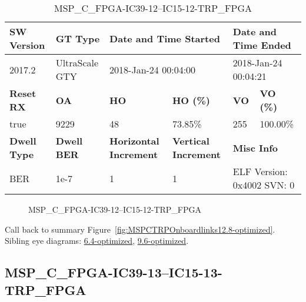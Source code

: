 \begin{table}[h]
\centering
\caption{MSP\_C\_FPGA-IC39-12--IC15-12-TRP\_FPGA}
\label{tab:MSPCFPGAIC3912IC1512TRPFPGA12.8-optimized}
\begin{tabular}{@{}|l|l|l|l|l|l|@{}}
\toprule
\textbf{SW Version}                & \textbf{GT Type}   & \multicolumn{2}{l|}{\textbf{Date and Time Started}}            & \multicolumn{2}{l|}{\textbf{Date and Time Ended}}        \\ \midrule
2017.2                       & UltraScale GTY          & \multicolumn{2}{l|}{2018-Jan-24 00:04:00}                   & \multicolumn{2}{l|}{2018-Jan-24 00:04:21}               \\ \midrule
\textbf{Reset RX}                  & \textbf{OA} & \textbf{HO}   & \textbf{HO (\%)} & \textbf{VO} & \textbf{VO (\%)} \\ \midrule
true & 9229        & 48          & 73.85\%        & 255        & 100.00\%       \\ \midrule
\textbf{Dwell Type}                & \textbf{Dwell BER} & \textbf{Horizontal Increment} & \textbf{Vertical Increment}    & \multicolumn{2}{l|}{\textbf{Misc Info}}                  \\ \midrule
BER                            & 1e-7        & 1        & 1           & \multicolumn{2}{l|}{ELF Version: 0x4002 SVN: 0}                         \\ \bottomrule
\end{tabular}
\end{table}

\begin{figure}[h]
\caption{MSP\_C\_FPGA-IC39-12--IC15-12-TRP\_FPGA} \label{fig:MSPCFPGAIC3912IC1512TRPFPGA12.8-optimized}
\end{figure}

Call back to summary Figure~\ref{fig:MSPCTRPOnboardlinks12.8-optimized}.
Sibling eye diagrams: \hyperref[sec:MSPCFPGAIC3912IC1512TRPFPGA6.4-optimized]{6.4-optimized}, \hyperref[sec:MSPCFPGAIC3912IC1512TRPFPGA9.6-optimized]{9.6-optimized}.

\clearpage
\newpage


\subsection{MSP\_C\_FPGA-IC39-13--IC15-13-TRP\_FPGA}\label{sec:MSPCFPGAIC3913IC1513TRPFPGA12.8-optimized}

